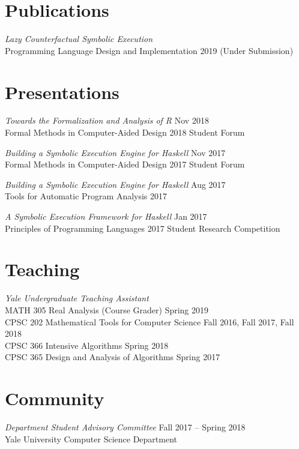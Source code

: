 \documentclass[margin]{res}
\begin{document}
\begin{resume}
\section{Publications}
\textit{Lazy Counterfactual Symbolic Execution} \\
Programming Language Design and Implementation 2019 (Under Submission) \\



\section{Presentations}
\textit{Towards the Formalization and Analysis of R}
  \hfill Nov 2018 \\
Formal Methods in Computer-Aided Design 2018 Student Forum

\textit{Building a Symbolic Execution Engine for Haskell}
  \hfill Nov 2017 \\
Formal Methods in Computer-Aided Design 2017 Student Forum

\textit{Building a Symbolic Execution Engine for Haskell}
  \hfill Aug 2017 \\
Tools for Automatic Program Analysis 2017

\textit{A Symbolic Execution Framework for Haskell}
  \hfill Jan 2017 \\
Principles of Programming Languages 2017 Student Research Competition


\section{Teaching}
\textit{Yale Undergraduate Teaching Assistant} \\
  MATH 305 Real Analysis (Course Grader)
    \hfill Spring 2019 \\
  CPSC 202 Mathematical Tools for Computer Science
    \hfill Fall 2016, Fall 2017, Fall 2018 \\
  CPSC 366 Intensive Algorithms
    \hfill Spring 2018 \\
  CPSC 365 Design and Analysis of Algorithms
    \hfill Spring 2017

\section{Community}
\textit{Department Student Advisory Committee}
  \hfill Fall 2017 -- Spring 2018 \\
Yale University Computer Science Department


\end{resume}
\end{document}
